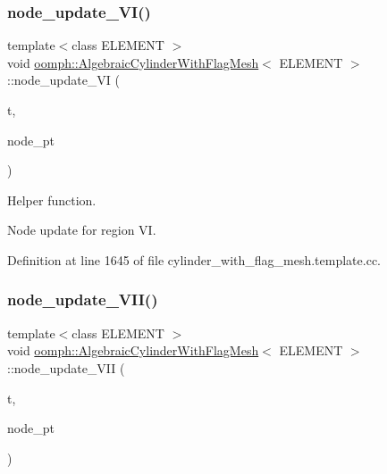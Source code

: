\subsubsection{\texorpdfstring{node\+\_\+update\+\_\+\+V\+I()}{node\_update\_VI()}}
{\footnotesize\ttfamily template$<$class E\+L\+E\+M\+E\+NT $>$ \\
void \hyperlink{classoomph_1_1AlgebraicCylinderWithFlagMesh}{oomph\+::\+Algebraic\+Cylinder\+With\+Flag\+Mesh}$<$ E\+L\+E\+M\+E\+NT $>$\+::node\+\_\+update\+\_\+\+VI (\begin{DoxyParamCaption}\item[{const unsigned \&}]{t,  }\item[{Algebraic\+Node $\ast$\&}]{node\+\_\+pt }\end{DoxyParamCaption})\hspace{0.3cm}{\ttfamily [protected]}}



Helper function. 

Node update for region VI. 

Definition at line 1645 of file cylinder\+\_\+with\+\_\+flag\+\_\+mesh.\+template.\+cc.

\mbox{\label{classoomph_1_1AlgebraicCylinderWithFlagMesh_abb0565f0624583d2549f38602fd11e48}} 
\subsubsection{\texorpdfstring{node\+\_\+update\+\_\+\+V\+I\+I()}{node\_update\_VII()}}
{\footnotesize\ttfamily template$<$class E\+L\+E\+M\+E\+NT $>$ \\
void \hyperlink{classoomph_1_1AlgebraicCylinderWithFlagMesh}{oomph\+::\+Algebraic\+Cylinder\+With\+Flag\+Mesh}$<$ E\+L\+E\+M\+E\+NT $>$\+::node\+\_\+update\+\_\+\+V\+II (\begin{DoxyParamCaption}\item[{const unsigned \&}]{t,  }\item[{Algebraic\+Node $\ast$\&}]{node\+\_\+pt }\end{DoxyParamCaption})\hspace{0.3cm}{\ttfamily [protected]}}



